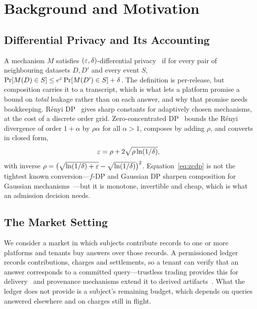 \section{Background and Motivation}
\label{sec:background}

\subsection{Differential Privacy and Its Accounting}
\label{sec:bg-dp}

A mechanism $M$ satisfies $(\varepsilon,\delta)$-differential
privacy~\cite{dwork2006differential} if for every pair of neighbouring datasets $D,D'$
and every event $S$, $\Pr[M(D)\in S]\le e^{\varepsilon}\Pr[M(D')\in S]+\delta$. The
definition is per-release, but composition carries it to a transcript, which is what
lets a platform promise a bound on \emph{total} leakage rather than on each answer,
and why that promise needs bookkeeping. R\'enyi DP~\cite{mironov2017renyi} gives sharp
constants for adaptively chosen mechanisms, at the cost of a discrete order grid.
Zero-concentrated DP~\cite{bun2016concentrated} bounds the R\'enyi divergence of
order $1+\alpha$ by $\rho\alpha$ for all $\alpha>1$, composes by adding $\rho$,
and converts in closed form,
\begin{equation}
\varepsilon = \rho + 2\sqrt{\rho\ln(1/\delta)} ,
\label{eq:zcdp}
\end{equation}
with inverse $\rho = \bigl(\sqrt{\ln(1/\delta)+\varepsilon}-\sqrt{\ln(1/\delta)}\bigr)^{2}$.
Equation~\eqref{eq:zcdp} is not the tightest known conversion---$f$-DP and
Gaussian DP sharpen composition for Gaussian mechanisms~\cite{dong2021rejoinder}---but
it is monotone, invertible and cheap, which is what an admission decision needs.

\subsection{The Market Setting}
\label{sec:bg-market}

We consider a market in which subjects contribute records to one or more platforms
and tenants buy answers over those records. A permissioned ledger records
contributions, charges and settlements, so a tenant can verify that an answer
corresponds to a committed query---trustless trading provides this for
delivery~\cite{liu2025yotta} and provenance mechanisms extend it to derived
artifacts~\cite{zhu2025auditing}. What the ledger does not provide is a subject's
remaining budget, which depends on queries answered elsewhere and on charges still in
flight.


